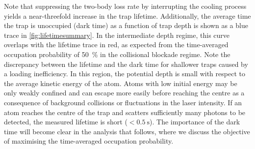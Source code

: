 \documentclass[../Thesis-IJspeert.tex]{subfiles}
\begin{document}
Note that suppressing the two-body loss rate by interrupting the cooling process yields a near-threefold increase in the trap lifetime. Additionally, the average time the trap is unoccupied (dark time) as a function of trap depth is shown as a blue trace in \autoref{fig:lifetimesummary}. In the intermediate depth regime, this curve overlaps with the lifetime trace in red, as expected from the time-averaged occupation probability of \SI{50}{\percent} in the collisional blockade regime. Note the discrepancy between the lifetime and the dark time for shallower traps caused by a loading inefficiency. In this region, the potential depth is small with respect to the average kinetic energy of the atom. Atoms with low initial energy may be only weakly confined and can escape more easily before reaching the centre as a consequence of background collisions or fluctuations in the laser intensity. If an atom reaches the centre of the trap and scatters sufficiently many photons to be detected, the measured lifetime is short ($<\SI{0.5}{\second}$). The importance of the dark time will become clear in the analysis that follows, where we discuss the objective of maximising the time-averaged occupation probability.
\end{document}

